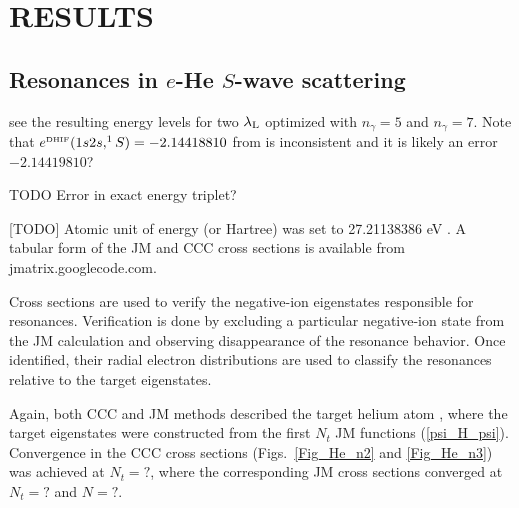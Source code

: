 \documentclass[aip
, pra
, showpacs
, aps
, twocolumn
, groupedaddress
, floatfix
]{revtex4}
\begin{document}
\section{RESULTS}

\subsection{Resonances in $e$-He $S$-wave scattering}

see the resulting energy levels for two $\lambda_{\rm L}$ optimized with $n_\gamma=5$ and $n_\gamma=7$.
Note that $e^{\mbox{\tiny{DHIF}}}(1s2s,^1S)=-2.14418810$ from \cite{DHIF94} is inconsistent
and it is likely an error $-2.14419810$?


TODO Error in exact energy triplet?

[TODO]
Atomic unit of energy (or Hartree) was set to 27.21138386 eV \cite{MTN08}. A tabular
form of the JM and CCC cross sections is available from jmatrix.googlecode.com.


Cross sections are used to verify the negative-ion eigenstates responsible for resonances.
Verification is done by excluding a particular negative-ion state from the JM calculation and observing disappearance of the resonance behavior.
Once identified, their radial electron distributions are used to classify the resonances relative to the target eigenstates.






Again, both CCC and JM methods described the target helium atom
, where the target eigenstates were constructed from the first $N_t$ JM functions (\ref{psi_H_psi}). Convergence in the CCC cross sections
(Figs.~\ref{Fig_He_n2} and \ref{Fig_He_n3}) was achieved at $N_t=?$, where the corresponding JM cross sections
converged at $N_t=?$ and $N=?$.
\end{document}
